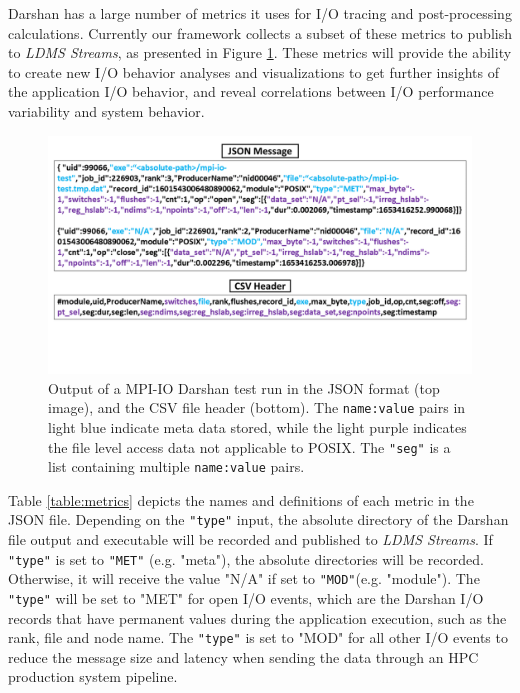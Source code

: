 Darshan has a large number of metrics it uses for I/O tracing and
post-processing calculations. Currently our framework
collects a subset of these metrics to publish to \emph{LDMS Streams},
as presented in Figure \ref{f:CSV Header and Output}. These metrics
will provide the ability to create new I/O behavior analyses and 
visualizations to get further insights of the application I/O behavior, 
and reveal correlations between I/O performance variability and system behavior.
\begin{figure}
	\centering
	\includegraphics[trim={0 3cm 0 0},clip, width=1.01\linewidth]{figs/darshan-csv-json.png}
	\caption{Output of a MPI-IO Darshan test run in the JSON
          format (top image), and the CSV file header (bottom). 
          The \texttt{name:value} pairs in light blue
          indicate meta data stored, while the light purple indicates
          the file level access data not applicable to POSIX.
          The \texttt{"seg"} is a list containing multiple \texttt{name:value} pairs.}
	\label{f:CSV Header and Output}
\end{figure}
Table \ref{table:metrics} depicts the names and definitions of each
metric in the JSON file. Depending on the \texttt{"type"} input, the
absolute directory of the Darshan file output and executable will be
recorded and published to \emph{LDMS Streams}. If \texttt{"type"} is
set to \texttt{"MET"} (e.g. "meta"), the absolute directories will be
recorded. Otherwise, it will receive the value "N/A" if set to
\texttt{"MOD"}(e.g. "module"). The \texttt{"type"} will be set to
"MET" for open I/O events, which are the Darshan I/O records that have
permanent values during the application execution, such as the rank,
file and node name. The \texttt{"type"} is set to "MOD" for all other
I/O events to reduce the message size and latency when sending the
data through an HPC production system pipeline.

